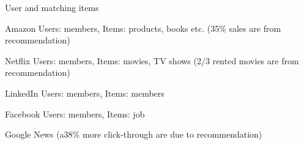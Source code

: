 \begin{bulletedlist}
\begin{bulletedlist}
		\end{bulletedlist}
		\item User and matching items
		\begin{bulletedlist}
			\item Amazon Users: members, Items: products, books etc. (35\% sales are from recommendation)
			\item Netflix Users: members, Items: movies, TV shows (2/3 rented movies are from recommendation)
			\item LinkedIn Users: members, Items: members
			\item Facebook Users: members, Items: job
			\item Google News (a38\% more click-through are due to recommendation)
		\end{bulletedlist}
	\end{bulletedlist} 